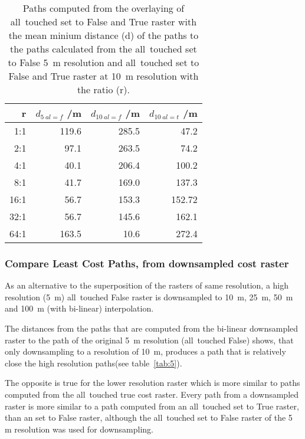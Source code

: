\begin{table}[h!]
	\caption{Paths computed from the overlaying of all~touched set to False and True raster with the mean minium distance (d) of the paths to the paths calculated from the all~touched set to False 5~m resolution and all~touched set to False and True raster at 10~m resolution with the ratio (r).}
	\label{tab:4}
	\centering
	\begin{tabular}{ r  r  r  r}
		r & $d_{5~al=f}$ /m &  $d_{10~al=f}$ /m & $d_{10~al=t}$ /m \\
		\hline
		
		  1:1  &    119.6 &  285.5 &  47.2\\
		  2:1  &    97.1 &  263.5 &  74.2\\
		  4:1  &    40.1 &  206.4 & 100.2\\
		  8:1  &    41.7 &  169.0 & 137.3\\
		 16:1  &    56.7 &  153.3 & 152.72\\
		 32:1  &    56.7 &  145.6 & 162.1\\
		 64:1  &   163.5 &   10.6 & 272.4\\
		
	\end{tabular}
\end{table}


\subsubsection{Compare Least Cost Paths, from downsampled cost raster}

As an alternative to the superposition of the rasters of same resolution, a high resolution (5~m) all~touched False raster is downsampled to 10~m, 25~m, 50~m and 100~m (with bi-linear) interpolation.

The distances from the paths that are computed from the bi-linear downsampled raster to the path of the original 5~m resolution (all~touched False) shows, that only downsampling to a resolution of 10~m, produces a path that is relatively close the high resolution paths(see table~\ref{tab:5}).

The opposite is true for the lower resolution raster which is more similar to paths computed from the all~touched true cost raster.
Every path from a downsampled raster is more similar to a path computed from an all~touched set to True raster, than an set to False raster, although the all~touched set to False raster of the 5 m resolution was used for downsampling.

